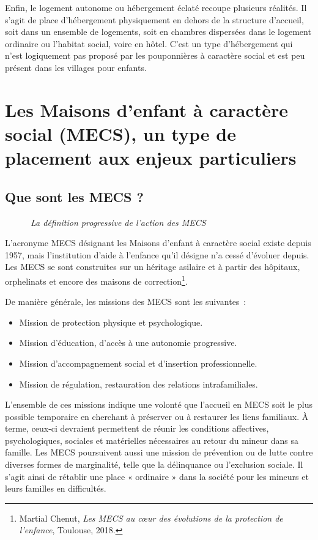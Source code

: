 \documentclass[
  12,
  a4paper,
]{report}
\begin{document}
Enfin, le logement autonome ou hébergement éclaté recoupe plusieurs
réalités. Il s'agit de place d'hébergement physiquement en dehors de la
structure d'accueil, soit dans un ensemble de logements, soit en
chambres dispersées dans le logement ordinaire ou l'habitat social,
voire en hôtel. C'est un type d'hébergement qui n'est logiquement pas
proposé par les pouponnières à caractère social et est peu présent dans
les villages pour enfants.

\hypertarget{les-maisons-denfant-uxe0-caractuxe8re-social-mecs-un-type-de-placement-aux-enjeux-particuliers}{%
\section{Les Maisons d'enfant à caractère social (MECS), un type de
placement aux enjeux
particuliers}\label{les-maisons-denfant-uxe0-caractuxe8re-social-mecs-un-type-de-placement-aux-enjeux-particuliers}}

\hypertarget{que-sont-les-mecs}{%
\subsection{Que sont les MECS ?}\label{que-sont-les-mecs}}

~~~~~~\emph{La définition progressive de l'action des MECS}

L'acronyme MECS désignant les Maisons d'enfant à caractère social existe
depuis 1957, mais l'institution d'aide à l'enfance qu'il désigne n'a
cessé d'évoluer depuis. Les MECS se sont construites sur un héritage
asilaire et à partir des hôpitaux, orphelinats et encore des maisons de
correction\footnote{Martial Chenut, \emph{Les MECS au cœur des
  évolutions de la protection de l'enfance}, {Toulouse}, 2018.}.

De manière générale, les missions des MECS sont les suivantes~:

\begin{itemize}
\item
  Mission de protection physique et psychologique.
\item
  Mission d'éducation, d'accès à une autonomie progressive.
\item
  Mission d'accompagnement social et d'insertion professionnelle.
\item
  Mission de régulation, restauration des relations intrafamiliales.
\end{itemize}

L'ensemble de ces missions indique une volonté que l'accueil en MECS
soit le plus possible temporaire en cherchant à préserver ou à restaurer
les liens familiaux. À terme, ceux-ci devraient permettent de réunir les
conditions affectives, psychologiques, sociales et matérielles
nécessaires au retour du mineur dans sa famille. Les MECS poursuivent
aussi une mission de prévention ou de lutte contre diverses formes de
marginalité, telle que la délinquance ou l'exclusion sociale. Il s'agit
ainsi de rétablir une place « ordinaire » dans la société pour les
mineurs et leurs familles en difficultés.
\end{document}
